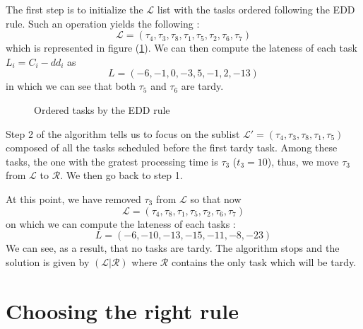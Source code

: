 The first step is to initialize the $\mathcal L$ list with the tasks ordered following the EDD rule. Such an operation yields the following : \[ \mathcal L = (\tau_4, \tau_3, \tau_8, \tau_1, \tau_5, \tau_2, \tau_6, \tau_7) \]
which is represented in figure (\ref{scheduling:init_edd}). We can then compute the lateness of each task $L_i = C_i - dd_i$ as \[ L = ( -6, -1, 0, -3, 5, -1, 2, -13 ) \] in which we can see that both $\tau_5$ and $\tau_6$ are tardy. 

\begin{figure}[h!]
    \centering
    \caption{\label{scheduling:init_edd}Ordered tasks by the EDD rule}
\end{figure}

Step 2 of the algorithm tells us to focus on the sublist $\mathcal L' = ( \tau_4, \tau_3, \tau_8, \tau_1, \tau_5 )$ composed of all the tasks scheduled before the first tardy task. Among these tasks, the one with the gratest processing time is $\tau_3$ ($t_3 = 10$), thus, we move $\tau_3$ from $\mathcal L$ to $\mathcal R$. We then go back to step 1.

At this point, we have removed $\tau_3$ from $\mathcal L$ so that now \[ \mathcal L = (\tau_4, \tau_8, \tau_1, \tau_5, \tau_2, \tau_6, \tau_7) \] on which we can compute the lateness of each tasks : \[ L = (-6, -10, -13, -15, -11, -8, -23) \] We can see, as a result, that no tasks are tardy. The algorithm stops and the solution is given by $(\mathcal L | \mathcal R)$ where $\mathcal R$ contains the only task which will be tardy. 

\section{Choosing the right rule}

